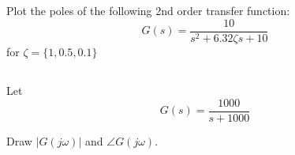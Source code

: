 \documentclass{article}	%
\begin{document}



\subsection{}
Plot the poles of the following 2nd order transfer function:
\[
G(s) = \frac{10}{s^2 + 6.32\zeta s + 10}
\]
for $\zeta = \{ 1, 0.5, 0.1 \}$

%
%
%



\subsection{}
Let
\[
G(s) = \frac{1000}{s+1000}
\]

Draw $|G(j\omega)|$ and $\angle G(j\omega)$.

%
%
%
%
%
%
%
%
%
%
\end{document}
